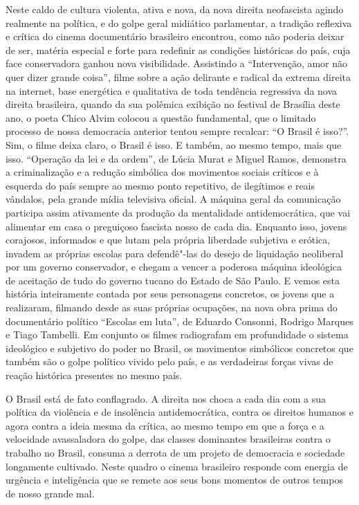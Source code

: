 Neste caldo de cultura violenta, ativa e nova, da nova direita
neofascista agindo realmente na política, e do golpe geral midiático
parlamentar, a tradição reflexiva e crítica do cinema documentário
brasileiro encontrou, como não poderia deixar de ser, matéria especial e
forte para redefinir as condições históricas do país, cuja face
conservadora ganhou nova visibilidade. Assistindo a ``Intervenção, amor
não quer dizer grande coisa'', filme sobre a ação delirante e radical da
extrema direita na internet, base energética e qualitativa de toda
tendência regressiva da nova direita brasileira, quando da sua polêmica
exibição no festival de Brasília deste ano, o poeta Chico Alvim colocou
a questão fundamental, que o limitado processo de nossa democracia
anterior tentou sempre recalcar: ``O Brasil é isso?''. Sim, o filme
deixa claro, o Brasil é isso. E também, ao mesmo tempo, mais que isso.
``Operação da lei e da ordem'', de Lúcia Murat e Miguel Ramos, demonstra
a criminalização e a redução simbólica dos movimentos sociais críticos e
à esquerda do país sempre ao mesmo ponto repetitivo, de ilegítimos e
reais vândalos, pela grande mídia televisiva oficial. A máquina geral da
comunicação participa assim ativamente da produção da mentalidade
antidemocrática, que vai alimentar em casa o preguiçoso fascista nosso
de cada dia. Enquanto isso, jovens corajosos, informados e que lutam
pela própria liberdade subjetiva e erótica, invadem as próprias escolas
para defendê"-las do desejo de liquidação neoliberal por um governo
conservador, e chegam a vencer a poderosa máquina ideológica de
aceitação de tudo do governo tucano do Estado de São Paulo. E vemos esta
história inteiramente contada por seus personagens concretos, os jovens
que a realizaram, filmando desde as suas próprias ocupações, na nova
obra prima do documentário político ``Escolas em luta'', de Eduardo
Consonni, Rodrigo Marques e Tiago Tambelli. Em conjunto os filmes
radiografam em profundidade o sistema ideológico e subjetivo do poder no
Brasil, os movimentos simbólicos concretos que também são o golpe
político vivido pelo país, e as verdadeiras forças vivas de reação
histórica presentes no mesmo país.

O Brasil está de fato conflagrado. A direita nos choca a cada dia com a
sua política da violência e de insolência antidemocrática, contra os
direitos humanos e agora contra a ideia mesma da crítica, ao mesmo tempo
em que a força e a velocidade avassaladora do golpe, das classes
dominantes brasileiras contra o trabalho no Brasil, consuma a derrota de
um projeto de democracia e sociedade longamente cultivado. Neste quadro
o cinema brasileiro responde com energia de urgência e inteligência que
se remete aos seus bons momentos de outros tempos de nosso grande mal.

